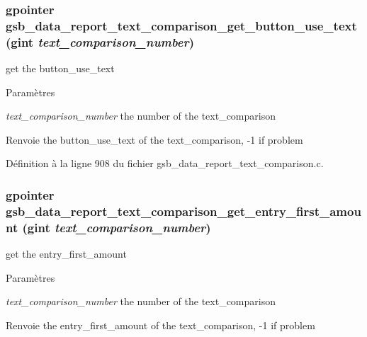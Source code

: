 \subsubsection[{gsb\_\-data\_\-report\_\-text\_\-comparison\_\-get\_\-button\_\-use\_\-text}]{\setlength{\rightskip}{0pt plus 5cm}gpointer gsb\_\-data\_\-report\_\-text\_\-comparison\_\-get\_\-button\_\-use\_\-text (gint {\em text\_\-comparison\_\-number})}\label{gsb__data__report__text__comparison_8h_a6e6be29beafd0d972e146091e38e0955}
get the button\_\-use\_\-text


\begin{DoxyParams}{Paramètres}
\item[{\em text\_\-comparison\_\-number}]the number of the text\_\-comparison\end{DoxyParams}
\begin{DoxyReturn}{Renvoie}
the button\_\-use\_\-text of the text\_\-comparison, -\/1 if problem 
\end{DoxyReturn}


Définition à la ligne 908 du fichier gsb\_\-data\_\-report\_\-text\_\-comparison.c.

\subsubsection[{gsb\_\-data\_\-report\_\-text\_\-comparison\_\-get\_\-entry\_\-first\_\-amount}]{\setlength{\rightskip}{0pt plus 5cm}gpointer gsb\_\-data\_\-report\_\-text\_\-comparison\_\-get\_\-entry\_\-first\_\-amount (gint {\em text\_\-comparison\_\-number})}\label{gsb__data__report__text__comparison_8h_a40e301a26e8349feb8b4b6f7b72ee87f}
get the entry\_\-first\_\-amount


\begin{DoxyParams}{Paramètres}
\item[{\em text\_\-comparison\_\-number}]the number of the text\_\-comparison\end{DoxyParams}
\begin{DoxyReturn}{Renvoie}
the entry\_\-first\_\-amount of the text\_\-comparison, -\/1 if problem 
\end{DoxyReturn}


